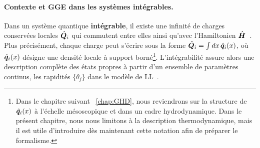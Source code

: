 


\paragraph{Contexte et \gls{GGE} dans les systèmes intégrables.}

Dans un système quantique {\bf intégrable}, il existe une infinité de charges conservées locales $\hat{\bm{Q}}_i$ qui commutent entre elles ainsi qu’avec l’Hamiltonien $\hat{\bm{H}}$~\cite{rigol2007relaxation, rigol2007}. Plus précisément, chaque charge peut s’écrire sous la forme $\hat{\bm{Q}}_i = \int dx\, \hat{\bm{q}}_i(x)$, où $\hat{\bm{q}}_i(x)$ désigne une densité locale à support borné\footnote{Dans le chapitre suivant ~\ref{chap:GHD}, nous reviendrons sur la structure de $\hat{\bm{q}}_i(x)$ à l’échelle mésoscopique et dans un cadre hydrodynamique. Dans le présent chapitre, nous nous limitons à la description thermodynamique, mais il est utile d’introduire dès maintenant cette notation afin de préparer le formalisme.}. L’intégrabilité assure alors une description complète des états propres à partir d’un ensemble de paramètres continus, les rapidités $\{\theta_j\}$ dans le modèle de \gls{LL}~\cite{Nardis_2016}.

